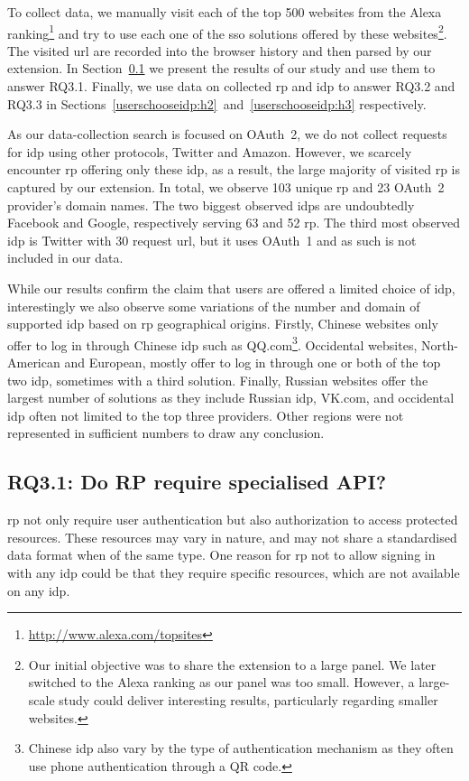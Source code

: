 To collect data, we manually visit each of the top 500 websites from the Alexa ranking\footnote{\url{http://www.alexa.com/topsites}} and try to use each one of the \gls{sso} solutions offered by these websites\footnote{Our initial objective was to share the extension to a large panel. We later switched to the Alexa ranking as our panel was too small. However, a large-scale study could deliver interesting results, particularly regarding smaller websites.}.
The visited \gls{url} are recorded into the browser history and then parsed by our extension.
In Section~\ref{userschooseidp:h1} we present the results of our study and use them to answer RQ3.1. 
Finally, we use data on collected \gls{rp} and \gls{idp} to answer RQ3.2 and RQ3.3 in Sections~\ref{userschooseidp:h2}~and~\ref{userschooseidp:h3} respectively.

As our data-collection search is focused on OAuth~2, we do not collect requests for \gls{idp} using other protocols, \eg Twitter and Amazon.
However, we scarcely encounter \gls{rp} offering only these \gls{idp}, as a result, the large majority of visited \gls{rp} is captured by our extension.
In total, we observe 103 unique \gls{rp} and 23 OAuth~2 provider's domain names. 
The two biggest observed \gls{idp}s are undoubtedly Facebook and Google, respectively serving 63 and 52 \gls{rp}.
The third most observed \gls{idp} is Twitter with 30 request \gls{url}, but it uses OAuth~1 and as such is not included in our data.

While our results confirm the claim that users are offered a limited choice of \gls{idp}, interestingly we also observe some variations of the number and domain of supported \gls{idp} based on \gls{rp} geographical origins.
Firstly, Chinese websites only offer to log in through Chinese \gls{idp} such as QQ.com\footnote{Chinese \gls{idp} also vary by the type of authentication mechanism as they often use phone authentication through a QR code.}. 
Occidental websites, \ie North-American and European, mostly offer to log in through one or both of the top two \gls{idp}, sometimes with a third solution.
Finally, Russian websites offer the largest number of solutions as they include Russian \gls{idp}, \eg VK.com, and occidental \gls{idp} often not limited to the top three providers.
Other regions were not represented in sufficient numbers to draw any conclusion.


\subsection{RQ3.1: Do RP require specialised API?}
\label{userschooseidp:h1}
\gls{rp} not only require user authentication but also authorization to access protected resources.
These resources may vary in nature, and may not share a standardised data format when of the same type.
One reason for \gls{rp} not to allow signing in with any \gls{idp} could be that they require specific resources, which are not available on any \gls{idp}.

